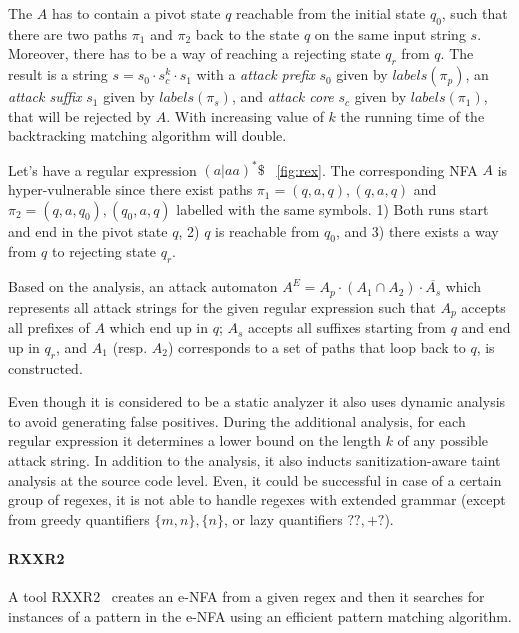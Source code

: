 \documentclass[acmsmall,screen]{acmart}
\begin{document}
The $A$ has to contain a pivot state $q$ reachable from the initial state $q_0$, such that there are two paths $\pi_1$ and $\pi_2$ back to the state $q$ 
on the same input string $s$.
%
Moreover, there has to be a way of reaching a rejecting state $q_r$ from $q$.
%
The result is a string $s = s_{0} \cdot s_{c}^{k} \cdot s_{1}$ with a \emph{attack prefix} $s_0$ given by $labels(\pi_p)$, an \emph{attack suffix} $s_1$ given by $labels(\pi_s)$,
and \emph{attack core} $s_c$ given by $labels(\pi_1)$, that will be rejected by $A$.
%
With increasing value of $k$ the running time of the backtracking matching algorithm will double.

\begin{example}
Let's have a regular expression $(a|aa)^*\$$ ~\cref{fig:rex}. The corresponding NFA $A$ is hyper-vulnerable since
there exist paths $\pi_1 = (q,a,q),(q,a,q)$ and $\pi_2 = (q,a,q_0),(q_0,a,q)$ labelled with the same symbols.
%
1) Both runs start and end in the pivot state $q$, 2) $q$ is reachable from $q_0$, and 3) there exists a way from $q$
to rejecting state $q_r$.
\end{example}

Based on the analysis, an attack automaton 
$A^{E} = A_p \cdot (A_1 \cap A_2) \cdot \overline{A_s}$
 which represents all attack strings for the given regular expression
such that $A_p$ accepts all prefixes of $A$ which end up in $q$; 
%
$A_s$ accepts all suffixes starting from $q$ and end up in $q_r$,
%
and $A_1$ (resp. $A_2$) corresponds to a set of paths that loop back to $q$, is constructed.

%
Even though it is considered to be a static analyzer it also uses dynamic analysis
% 
to avoid generating false positives.
%
During the additional analysis, for each regular expression it determines  
a lower bound on the length $k$ of any possible attack string.
%
In addition to the analysis, it also inducts sanitization-aware taint analysis at the source code level.
%
Even, it could be successful in case of a certain group of regexes,
it is not able to handle regexes with extended grammar (except from greedy quantifiers $\{m,n\},\{n\}$, or lazy quantifiers $??, +?$).




\paragraph{RXXR2}
A tool RXXR2~\cite{rxxr2thesis, rxxr2} creates an e-NFA from a given regex and 
then it searches for instances of a pattern in the e-NFA using an efficient pattern matching algorithm.
%
\end{document}
